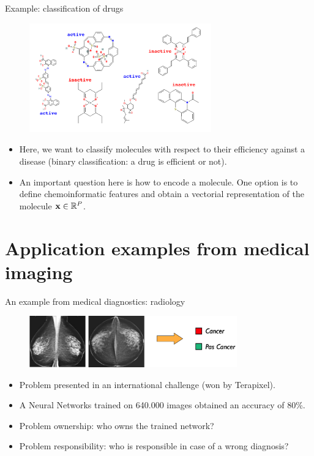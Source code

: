 \documentclass[xcolor=pdftex,dvipsnames,table]{beamer}
\begin{document}
\begin{frame}{Example: classification of drugs}
\begin{figure}[htb]
\includegraphics[width=0.7\textwidth]{../graphics/ml_example_drugs.pdf}
\end{figure}
\begin{itemize}
	\item Here, we want to classify molecules with respect to their efficiency against a disease (binary classification: a drug is efficient or not).
	\item An important question here is how to encode a molecule. One option is to define chemoinformatic features and obtain a vectorial representation of the molecule $\mathbf{x} \in \mathbb{R}^{P}$.
\end{itemize}
\end{frame}


\section{Application examples from medical imaging}
\begin{frame}{An example from  medical diagnostics: radiology}
\begin{figure}[htb]
\includegraphics[width=0.8\textwidth]{../graphics/radiology.pdf}
\end{figure}

\begin{itemize}
\item<1-> Problem presented in an international challenge (won by Terapixel). 
\item<2-> A Neural Networks trained on 640.000 images obtained an accuracy of 80\%. \
\item<3-> Problem ownership: who owns the trained network? 
\item<4-> Problem responsibility: who is responsible in case of a wrong diagnosis? 
\end{itemize}
\end{frame}
\end{document}
